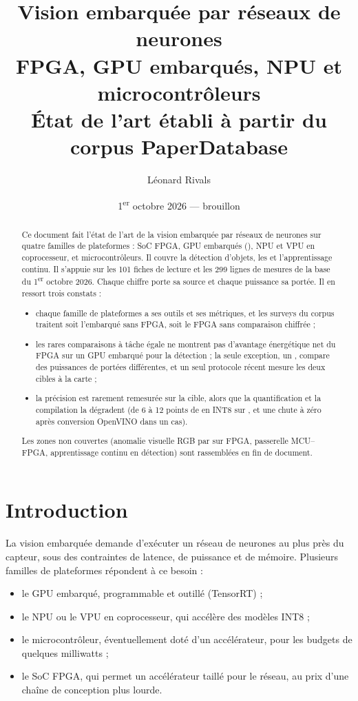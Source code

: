 \documentclass[11pt,a4paper]{article}
\title{\textbf{Vision embarquée par réseaux de neurones}\\[0.3em]
  \large FPGA, GPU embarqués, NPU et microcontrôleurs\\
  État de l'art établi à partir du corpus PaperDatabase}
\author{Léonard Rivals}
\date{1\textsuperscript{er} octobre 2026 --- brouillon}
\begin{document}
\maketitle

\begin{abstract}
Ce document fait l'état de l'art de la vision embarquée par réseaux de neurones sur quatre
familles de plateformes : SoC FPGA, GPU embarqués (), NPU et VPU en coprocesseur, et
microcontrôleurs. Il couvre la détection d'objets, les  et l'apprentissage
continu. Il s'appuie sur les 101 fiches de lecture et les 299 lignes de mesures de la
base du 1\textsuperscript{er} octobre 2026. Chaque chiffre porte sa source et chaque
puissance sa portée.
Il en ressort trois constats :
\begin{itemize}
  \item chaque famille de plateformes a ses outils et ses métriques, et les surveys du
    corpus traitent soit l'embarqué sans FPGA, soit le FPGA sans comparaison chiffrée ;
  \item les rares comparaisons à tâche égale ne montrent pas d'avantage énergétique net du
    FPGA sur un GPU embarqué pour la détection ; la seule exception, un , compare
    des puissances de portées différentes, et un seul protocole récent mesure les deux
    cibles à la carte ;
  \item la précision est rarement remesurée sur la cible, alors que la quantification et
    la compilation la dégradent (de 6 à 12 points de  en INT8 sur , et une
    chute à zéro après conversion OpenVINO dans un cas).
\end{itemize}
Les zones non couvertes (anomalie visuelle RGB par  sur FPGA, passerelle
MCU--FPGA, apprentissage continu en détection) sont rassemblées en fin de document.
\end{abstract}

\tableofcontents

\section{Introduction}

La vision embarquée demande d'exécuter un réseau de neurones au plus près du capteur, sous
des contraintes de latence, de puissance et de mémoire. Plusieurs familles de plateformes
répondent à ce besoin :
\begin{itemize}
  \item le GPU embarqué, programmable et outillé (TensorRT) ;
  \item le NPU ou le VPU en coprocesseur, qui accélère des modèles INT8 ;
  \item le microcontrôleur, éventuellement doté d'un accélérateur, pour les budgets de
    quelques milliwatts ;
  \item le SoC FPGA, qui permet un accélérateur taillé pour le réseau, au prix d'une chaîne
    de conception plus lourde.
\end{itemize}
\end{document}
